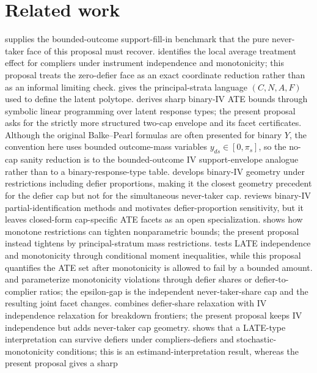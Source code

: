 \documentclass[11pt]{article}
\theoremstyle{definition}
\theoremstyle{plain}
\theoremstyle{remark}
\begin{document}
\section{Related work}
\citet{Manski1990} supplies the bounded-outcome support-fill-in benchmark that
the pure never-taker face of this proposal must recover.  \citet{ImbensAngrist1994}
identifies the local average treatment effect for compliers under instrument
independence and monotonicity; this proposal treats the zero-defier face as an
exact coordinate reduction rather than as an informal limiting check.
\citet{AngristImbensRubin1996} gives the principal-strata language
\((C,N,A,F)\) used to define the latent polytope.  \citet{BalkePearl1997}
derives sharp binary-IV ATE bounds through symbolic linear programming over
latent response types; the present proposal asks for the strictly more
structured two-cap envelope and its facet certificates.  Although the original
Balke--Pearl formulas are often presented for binary \(Y\), the convention here
uses bounded outcome-mass variables \(y_{ds}\in[0,\pi_s]\), so the no-cap
sanity reduction is to the bounded-outcome IV support-envelope analogue rather
than to a binary-response-type table.  \citet{RichardsonRobins2010}
develops binary-IV geometry under restrictions including defier proportions,
making it the closest geometry precedent for the defier cap but not for the
simultaneous never-taker cap.  \citet{SwansonHernanMillerRobinsRichardson2018}
reviews binary-IV partial-identification methods and motivates defier-proportion
sensitivity, but it leaves closed-form cap-specific ATE facets as an open
specialization.  \citet{ManskiPepper2000} shows how monotone restrictions can
tighten nonparametric bounds; the present proposal instead tightens by
principal-stratum mass restrictions.  \citet{MourifieWan2017} tests LATE
independence and monotonicity through conditional moment inequalities, while
this proposal quantifies the ATE set after monotonicity is allowed to fail by a
bounded amount.  \citet{Noack2021} and \citet{Yap2022} parameterize
monotonicity violations through defier shares or defier-to-complier ratios; the
epsilon-gap is the independent never-taker-share cap and the resulting joint
facet changes.  \citet{Picchetti2026} combines defier-share relaxation with IV
independence relaxation for breakdown frontiers; the present proposal keeps IV
independence but adds never-taker cap geometry.
\citet{DeChaisemartin2017} shows that a LATE-type interpretation can survive
defiers under compliers-defiers and stochastic-monotonicity conditions; this is
an estimand-interpretation result, whereas the present proposal gives a sharp
\end{document}
